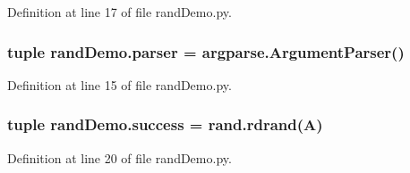 Definition at line 17 of file rand\-Demo.\-py.

\hypertarget{namespacerand_demo_aefb5f3796ae10e974d19b3df08a8268b}{
\subsubsection[{parser}]{\setlength{\rightskip}{0pt plus 5cm}tuple rand\-Demo.\-parser = argparse.\-Argument\-Parser()}}\label{namespacerand_demo_aefb5f3796ae10e974d19b3df08a8268b}


Definition at line 15 of file rand\-Demo.\-py.

\hypertarget{namespacerand_demo_a7b35ea6a4b4b19e13476f6e085556b7e}{
\subsubsection[{success}]{\setlength{\rightskip}{0pt plus 5cm}tuple rand\-Demo.\-success = rand.\-rdrand({\bf A})}}\label{namespacerand_demo_a7b35ea6a4b4b19e13476f6e085556b7e}


Definition at line 20 of file rand\-Demo.\-py.

